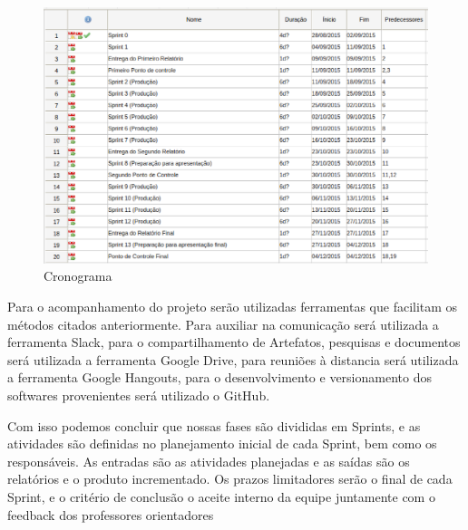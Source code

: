 \begin{figure}[!htb]
\centering
  \includegraphics[keepaspectratio=true,scale=0.5]{figuras/metodologia/cronograma}
\caption{Cronograma}
\label{fig:cronograma}
\end{figure}

Para o acompanhamento do projeto serão utilizadas ferramentas que facilitam os métodos citados anteriormente. Para auxiliar na comunicação será utilizada a ferramenta Slack, para o compartilhamento de Artefatos, pesquisas e documentos será utilizada a ferramenta Google Drive, para reuniões à distancia será utilizada a ferramenta Google Hangouts, para o desenvolvimento  e versionamento dos softwares provenientes será utilizado o GitHub.

Com isso podemos concluir que nossas fases são divididas em Sprints, e as atividades são definidas no planejamento inicial de cada Sprint, bem como os responsáveis. As entradas são as atividades planejadas e as saídas são os relatórios e o produto incrementado. Os prazos limitadores serão o final de cada Sprint, e o critério de conclusão o aceite interno da equipe juntamente com o feedback dos professores orientadores
